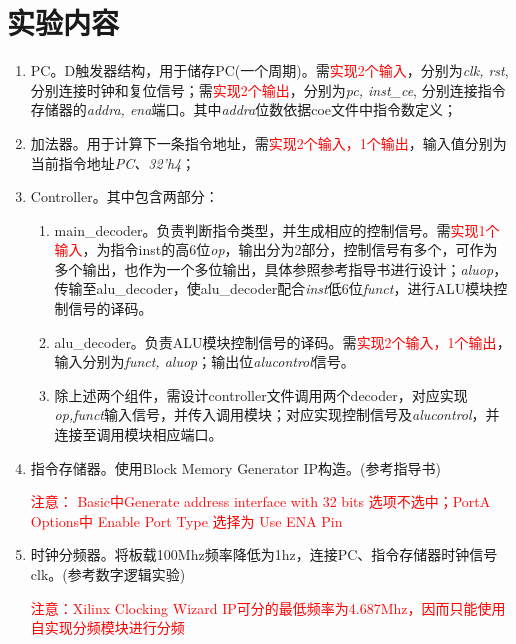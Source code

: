 \section{实验内容}
\begin{enumerate}
    \item PC。D触发器结构，用于储存PC(一个周期)。需\textcolor{red}{实现2个输入}，分别为\textit{clk, rst},分别连接时钟和复位信号；需\textcolor{red}{实现2个输出}，分别为\textit{pc, inst\_ce}, 分别连接指令存储器的\textit{addra, ena}端口。其中\textit{addra}位数依据coe文件中指令数定义；
    \item 加法器。用于计算下一条指令地址，需\textcolor{red}{实现2个输入，1个输出}，输入值分别为当前指令地址\textit{PC、32’h4}；
    \item Controller。其中包含两部分：
    \begin{enumerate}
        \item main\_decoder。负责判断指令类型，并生成相应的控制信号。需\textcolor{red}{实现1个输入}，为指令inst的高6位\textit{op}，输出分为2部分，\textcolor{epubblue}{控制信号}有多个，可作为多个输出，也作为一个多位输出，具体参照参考指导书进行设计；\textit{aluop}，传输至alu\_decoder，使alu\_decoder配合\textit{inst}低6位\textit{funct}，进行ALU模块控制信号的译码。
        \item alu\_decoder。负责ALU模块控制信号的译码。需\textcolor{red}{实现2个输入，1个输出}，输入分别为\textit{funct, aluop}；输出位\textit{alucontrol}信号。
        \item 除上述两个组件，需设计controller文件调用两个decoder，\textcolor{epubblue}{对应实现\textit{op,funct}输入信号，并传入调用模块；对应实现控制信号及\textit{alucontrol}，并连接至调用模块相应端口}。
    \end{enumerate}

    \item 指令存储器。使用Block Memory Generator IP构造。(参考指导书)
    
    \textcolor{red}{ 注意：	Basic中Generate address interface with 32 bits 选项不选中；PortA Options中 Enable Port Type 选择为 Use ENA Pin}
    \item 时钟分频器。将板载100Mhz频率降低为1hz，连接PC、指令存储器时钟信号clk。(参考数字逻辑实验)
    
    \textcolor{red}{注意：Xilinx Clocking Wizard IP可分的最低频率为4.687Mhz，因而只能使用自实现分频模块进行分频}
\end{enumerate}